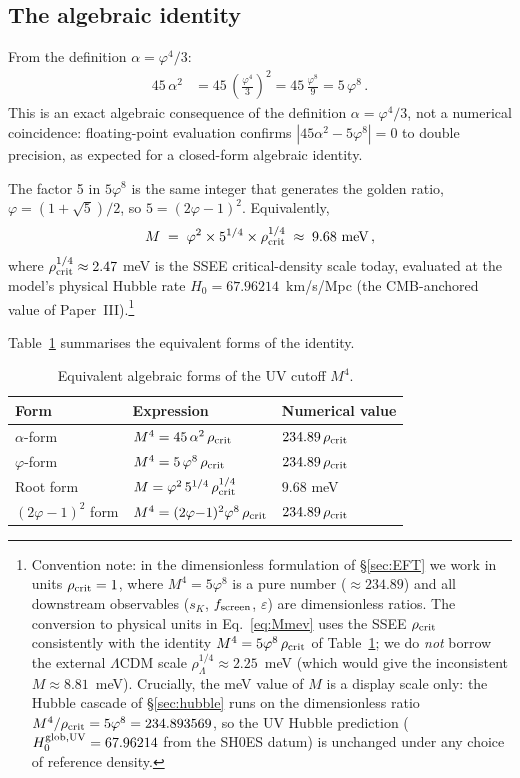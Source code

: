 \documentclass[12pt,a4paper]{article}
\newcommand{\phiG}{\varphi}
\newcommand{\rhoc}{\rho_{\rm crit}}
\begin{document}
\subsection{The algebraic identity}

From the definition $\alpha = \phiG^4/3$:
\begin{align}
  45\,\alpha^2
    &= 45\,\left(\frac{\phiG^4}{3}\right)^2
     = 45\,\frac{\phiG^8}{9}
     = 5\,\phiG^8\,.
  \label{eq:identity}
\end{align}
This is an exact algebraic consequence of the definition $\alpha = \phiG^4/3$,
not a numerical coincidence: floating-point evaluation confirms $|45\alpha^2 - 5\phiG^8| = 0$
to double precision, as expected for a closed-form algebraic identity.

The factor 5 in $5\phiG^8$ is the same integer that generates the golden ratio,
$\phiG = (1+\sqrt{5})/2$, so $5 = (2\phiG - 1)^2$.
Equivalently,
\begin{equation}
  M \;=\; \phiG^2 \times 5^{1/4} \times \rhoc^{1/4}
    \;\approx\; 9.68 \text{ meV}\,,
  \label{eq:Mmev}
\end{equation}
where $\rhoc^{1/4} \approx 2.47$ meV is the SSEE critical-density scale today,
evaluated at the model's physical Hubble rate $H_0 = 67.96214$~km/s/Mpc
(the CMB-anchored value of Paper~III).\footnote{Convention note: in the
dimensionless formulation of §\ref{sec:EFT} we work in units $\rhoc = 1$, where
$M^4 = 5\phiG^8$ is a pure number ($\approx 234.89$) and all downstream
observables ($s_K$, $f_{\rm screen}$, $\varepsilon$) are dimensionless
ratios. The conversion to physical units in Eq.~\eqref{eq:Mmev} uses the SSEE
$\rho_{\rm crit}$ consistently with the identity $M^4 = 5\phiG^8\,\rhoc$ of
Table~\ref{tab:identity}; we do \emph{not} borrow the external $\Lambda$CDM
scale $\rho_\Lambda^{1/4}\approx 2.25$~meV (which would give the inconsistent
$M\approx 8.81$~meV). Crucially, the meV value of $M$ is a display scale only:
the Hubble cascade of §\ref{sec:hubble} runs on the dimensionless ratio
$M^4/\rhoc = 5\phiG^8 = 234.893569$, so the UV Hubble prediction
($H_0^{\rm glob,UV}=67.96214$ from the SH0ES datum) is
unchanged under any choice of reference density.}

Table~\ref{tab:identity} summarises the equivalent forms of the identity.

\begin{table}[ht]
\centering
\caption{Equivalent algebraic forms of the UV cutoff $M^4$.}
\label{tab:identity}
\begin{tabular}{lll}
\toprule
Form & Expression & Numerical value \\
\midrule
$\alpha$-form & $M^4 = 45\,\alpha^2\,\rhoc$ & $234.89\,\rhoc$ \\
$\phiG$-form  & $M^4 = 5\,\phiG^8\,\rhoc$  & $234.89\,\rhoc$ \\
Root form     & $M = \phiG^2\,5^{1/4}\,\rhoc^{1/4}$ & $9.68$ meV \\
$(2\phiG{-}1)^2$ form & $M^4 = (2\phiG{-}1)^2 \phiG^8\,\rhoc$ & $234.89\,\rhoc$ \\
\bottomrule
\end{tabular}
\end{table}
\end{document}
